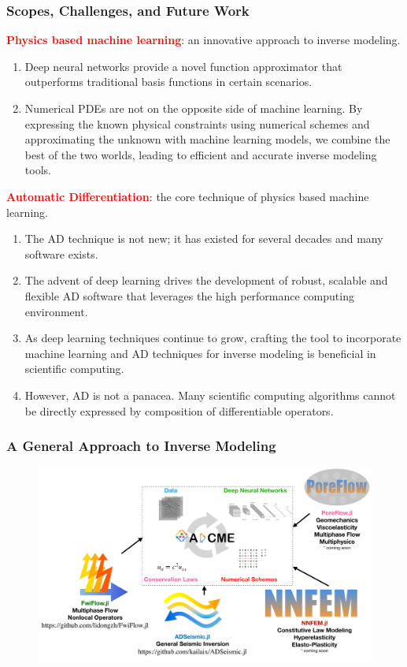 \documentclass{beamer}
\begin{document}
\begin{frame}
	\frametitle{Scopes, Challenges, and Future Work}
	\textcolor{red}{\textbf{Physics based machine learning}}: an innovative approach to inverse modeling. 
	{\scriptsize
	\begin{enumerate}
		\item Deep neural networks provide a novel function approximator that outperforms traditional basis functions in certain scenarios. 
		\item Numerical PDEs are not on the opposite side of machine learning. By expressing the known physical constraints using numerical schemes and approximating the unknown with machine learning models, we combine the best of the two worlds, leading to efficient and accurate inverse modeling tools. 
	\end{enumerate}
	}
		
		\textcolor{red}{\textbf{Automatic Differentiation}}: the core technique of physics based machine learning.
		{\scriptsize
		\begin{enumerate}
		\item The AD technique is not new; it has existed for several decades and many software exists. 
		\item The advent of deep learning drives the development of robust, scalable and flexible AD software that leverages the high performance computing environment. 
		\item As deep learning techniques continue to grow, crafting the tool to incorporate machine learning and AD techniques for inverse modeling is beneficial in scientific computing.
		\item However, AD is not a panacea. Many scientific computing algorithms cannot be directly expressed by composition of differentiable operators. 
	\end{enumerate}
	}
	
\end{frame}

\begin{frame}
	\frametitle{A General Approach to Inverse Modeling}
	\begin{figure}[hbt]
  \includegraphics[width=1.0\textwidth]{../summary}
\end{figure}

\end{frame}
\end{document}
